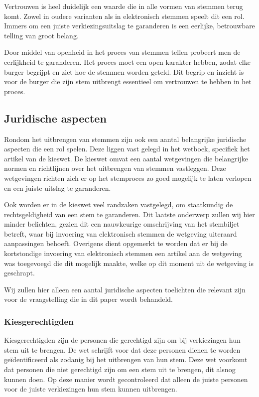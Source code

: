 \documentclass[a4paper]{article}
\begin{document}
Vertrouwen is heel duidelijk een waarde die in alle vormen van stemmen terug komt.
Zowel in oudere varianten als in elektronisch stemmen speelt dit een rol.
Immers om een juiste verkiezingsuitslag te garanderen is een eerlijke, betrouwbare telling van groot belang.

Door middel van openheid in het proces van stemmen tellen probeert men de eerlijkheid te garanderen.
Het proces moet een open karakter hebben, zodat elke burger begrijpt en ziet hoe de stemmen worden geteld.
Dit begrip en inzicht is voor de burger die zijn stem uitbrengt essentieel om vertrouwen te hebben in het proces.

\subsection{Juridische aspecten}
Rondom het uitbrengen van stemmen zijn ook een aantal belangrijke juridische aspecten die een rol spelen.
Deze liggen vast gelegd in het wetboek, specifiek het artikel van de kieswet.
De kieswet omvat een aantal wetgevingen die belangrijke normen en richtlijnen over het uitbrengen van stemmen vastleggen.
Deze wetgevingen richten zich er op het stemproces zo goed mogelijk te laten verlopen en een juiste uitslag te garanderen.

Ook worden er in de kieswet veel randzaken vastgelegd, om staatkundig de rechtsgeldigheid van een stem te garanderen.
Dit laatste onderwerp zullen wij hier minder belichten, gezien dit een nauwkeurige omschrijving van het stembiljet betreft, waar bij invoering van elektronisch stemmen de wetgeving uiteraard aanpassingen behoeft.
Overigens dient opgemerkt te worden dat er bij de kortstondige invoering van elektronisch stemmen een artikel aan de wetgeving was toegevoegd die dit mogelijk maakte, welke op dit moment uit de wetgeving is geschrapt.

Wij zullen hier alleen een aantal juridische aspecten toelichten die relevant zijn voor de vraagstelling die in dit paper wordt behandeld.

\subsubsection{Kiesgerechtigden}
Kiesgerechtigden zijn de personen die gerechtigd zijn om bij verkiezingen hun stem uit te brengen.
De wet schrijft voor dat deze personen dienen te worden geïdentificeerd als zodanig bij het uitbrengen van hun stem.
Deze wet voorkomt dat personen die niet gerechtigd zijn om een stem uit te brengen, dit alsnog kunnen doen.
Op deze manier wordt gecontroleerd dat alleen de juiste personen voor de juiste verkiezingen hun stem kunnen uitbrengen.
\end{document}
